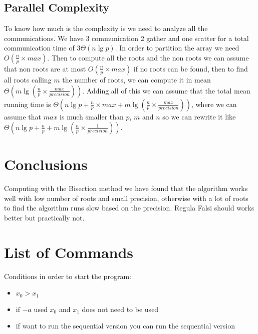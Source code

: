 \documentclass[a4paper,11pt,oneside]{book}
\begin{document}
\section*{Parallel Complexity}
To know how much is the complexity is we need to analyze all the communications. We have 3 communication 2 gather and one scatter for a total communication time of $3\Theta(n\lg p)$. In order to partition the array we need $O(\frac{n}{p}\times max)$. Then to compute all the roots and the non roots we can assume that non roots are at most $O(\frac{n}{p}\times max)$ if no roots can be found, then to find all roots calling $m$ the number of roots, we can compute it in mean $\Theta(m\lg (\frac{n}{p}\times\frac{max}{precision}))$. Adding all of this we can assume that the total mean running time is $\Theta(n\lg p + \frac{n}{p}\times max + m\lg (\frac{n}{p}\times\frac{max}{precision}))$, where we can assume that $max$ is much smaller than $p$, $m$ and $n$ so we can rewrite it like $\Theta(n\lg p + \frac{n}{p} + m\lg (\frac{n}{p}\times\frac{1}{precision}))$.







\chapter*{Conclusions}
Computing with the Bisection method we have found that the algorithm works well with low number of roots and small precision, otherwise with a lot of roots to find the algorithm runs slow based on the precision. Regula Falsi should works better but practically not.




\appendix
\chapter{List of Commands}


Conditions in order to start the program:
\begin{itemize}
\item $x_0 > x_1$
\item if  $-a$ used $x_0$ and $x_1$ does not need to be used
\item if want to run the sequential version you can run the sequential version
\end{itemize}
\end{document}

